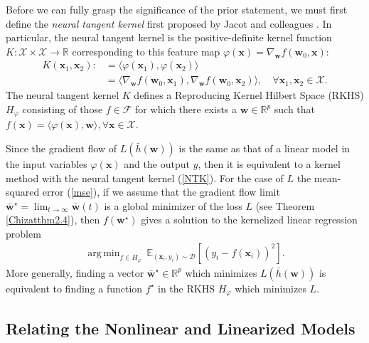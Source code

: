 \documentclass{article}
\DeclareMathOperator*{\argmin}{arg\,min}
\begin{document}
Before we can fully grasp the significance of the prior statement, we must first define the \textit{neural tangent kernel} first proposed by Jacot and colleagues \cite{jacot2018neural}. In particular, the neural tangent kernel is the positive-definite kernel function $K: \mathcal{X} \times \mathcal{X} \rightarrow \mathbb{R}$ corresponding to this feature map $\varphi(\boldsymbol{x}) = \nabla_{\boldsymbol{w}} f(\boldsymbol{w}_0, \boldsymbol{x})$:
\begin{align}
    K(\boldsymbol{x}_1, \boldsymbol{x}_2) :&= \langle \varphi(\boldsymbol{x}_1), \varphi(\boldsymbol{x}_2) \rangle \nonumber \\
    &= \langle \nabla_{\boldsymbol{w}} f(\boldsymbol{w}_0, \boldsymbol{x}_1), \nabla_{\boldsymbol{w}} f(\boldsymbol{w}_0, \boldsymbol{x}_2) \rangle, \quad \forall \boldsymbol{x}_1, \boldsymbol{x}_2 \in \mathcal{X}\label{NTK}.
\end{align}
The neural tangent kernel $K$ defines a Reproducing Kernel Hilbert Space (RKHS) $H_{\varphi}$ consisting of those $f \in \mathcal{F}$ for which there exists a  $\boldsymbol{w} \in \mathbb{R}^p$ such that $f(\boldsymbol{x}) = \langle \varphi(\boldsymbol{x}), \boldsymbol{w} \rangle, \forall \boldsymbol{x} \in \mathcal{X}$. 

Since the gradient flow of $L(\bar{h}(\boldsymbol{w}))$ is the same as that of a linear model in the input variables $\varphi(\boldsymbol{x})$ and the output $y$, then it is equivalent to a kernel method with the neural tangent kernel (\ref{NTK}). For the case of $L$ the mean-squared error (\ref{mse}), if we assume that the gradient flow limit $\boldsymbol{\bar{w}}^{\star} = \lim_{t \to \infty} \boldsymbol{\bar{w}}(t)$ is a global minimizer of the loss $L$ (see Theorem \ref{Chizatthm2.4}), then $f(\boldsymbol{\bar{w}}^{\star})$ gives a solution to the kernelized linear regression problem
\begin{align*}
    \argmin_{f \in H_{\varphi}} \ \mathbb{E}_{(\boldsymbol{x}_i, y_i) \sim \mathcal{D}}\left[(y_i - f(\boldsymbol{x}_i))^2 \right].
\end{align*}
More generally, finding a vector $\boldsymbol{\bar{w}}^{\star} \in \mathbb{R}^p$ which minimizes $L(\bar{h}(\boldsymbol{w}))$ is equivalent to finding a function $f^{\star}$ in the RKHS $H_{\varphi}$ which minimizes $L$.

\subsection{Relating the Nonlinear and Linearized Models}\label{kerneltheory}
\end{document}
